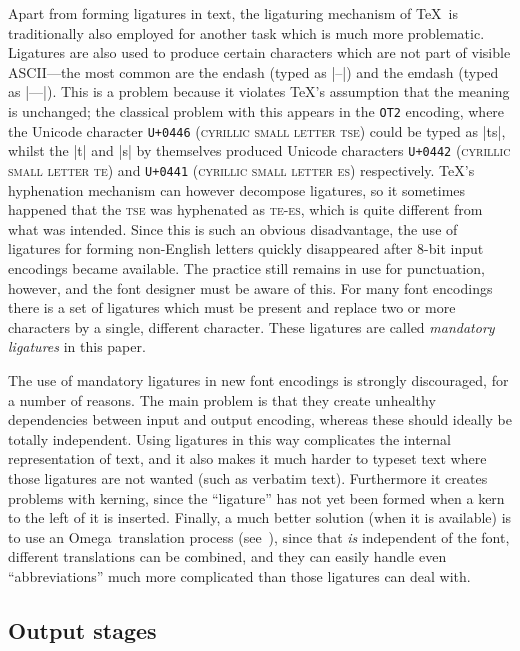 \documentclass[a4paper]{article}
\newcommand{\TeXOmega}{Omega}
\begin{document}
Apart from forming ligatures in text, the ligaturing mechanism of 
\TeX\ is traditionally also employed for another task which is much 
more problematic. Ligatures are also used to produce certain 
characters which are not part of visible ASCII---the most common are 
the endash (typed as |--|) and the emdash (typed as |---|). This is a 
problem because it violates \TeX's assumption that the meaning is 
unchanged; the classical problem with this appears in the \texttt{OT2} 
encoding, where the Unicode character \texttt{U+0446} 
(\textsc{cyrillic small letter tse}) could be typed as |ts|, whilst 
the |t| and |s| by themselves produced Unicode characters 
\texttt{U+0442} (\textsc{cyrillic small letter te}) and \texttt{U+0441} 
(\textsc{cyrillic small letter es}) respectively. \TeX's hyphenation 
mechanism can however decompose ligatures, so it sometimes happened 
that the \textsc{tse} was hyphenated as \textsc{te}-\textsc{es}, 
which is quite different from what was intended. Since this is such 
an obvious disadvantage, the use of ligatures for forming non-English 
letters quickly disappeared after 8-bit input encodings became 
available. The practice still remains in use for punctuation, however, 
and the font designer must be aware of this. For many font encodings 
there is a set of ligatures which must be present and replace two or 
more characters by a single, different character. These ligatures are 
called \emph{mandatory ligatures} in this paper.

The use of mandatory ligatures in new font encodings is strongly 
discouraged, for a number of reasons. The main problem is that they 
create unhealthy dependencies between input and output encoding, 
whereas these should ideally be totally independent. Using ligatures 
in this way complicates the internal representation of text, and it 
also makes it much harder to typeset text where those ligatures are not 
wanted (such as verbatim text). Furthermore it creates problems with 
kerning, since the ``ligature'' has not yet been formed when a kern 
to the left of it is inserted. Finally, a much better solution (when 
it is available) is to use an \TeXOmega\ translation process 
(see~\cite[Sec.~8--11]{Omega-doc}), since that \emph{is} independent 
of the font, different translations can be combined, and they can 
easily handle even ``abbreviations'' much more complicated than those 
ligatures can deal with.


\subsection{Output stages}
\end{document}
